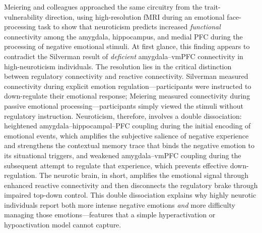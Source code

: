 Meiering and colleagues approached the same circuitry from the
trait-vulnerability direction, using high-resolution fMRI during an
emotional face-processing task to show that neuroticism predicts increased
\emph{functional} connectivity among the amygdala, hippocampus, and medial
PFC during the processing of negative emotional stimuli.\cite{meiering2026}  At first
glance, this finding appears to contradict the Silverman result of
\emph{deficient} amygdala--vmPFC connectivity in high-neuroticism
individuals.  The resolution lies in the critical distinction between
regulatory connectivity and reactive connectivity.  Silverman measured
connectivity during explicit emotion regulation---participants were
instructed to down-regulate their emotional response; Meiering measured
connectivity during passive emotional processing---participants simply
viewed the stimuli without regulatory instruction.  Neuroticism, therefore,
involves a double dissociation: heightened amygdala--hippocampal--PFC
coupling during the initial encoding of emotional events, which amplifies
the subjective salience of negative experience and strengthens the
contextual memory trace that binds the negative emotion to its situational
triggers, and weakened amygdala--vmPFC coupling during the subsequent
attempt to regulate that experience, which prevents effective
down-regulation.  The neurotic brain, in short, amplifies the emotional
signal through enhanced reactive connectivity and then disconnects the
regulatory brake through impaired top-down control.  This double
dissociation explains why highly neurotic individuals report both more
intense negative emotions \emph{and} more difficulty managing those
emotions---features that a simple hyperactivation or hypoactivation model
cannot capture.

